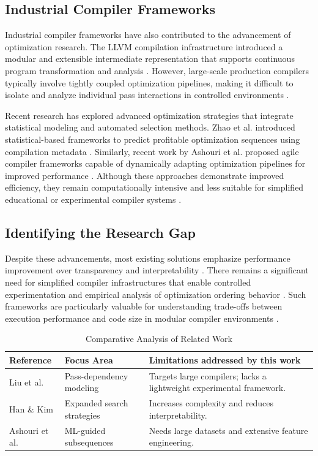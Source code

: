 \documentclass[conference]{IEEEtran}
\begin{document}
\subsection{Industrial Compiler Frameworks}
Industrial compiler frameworks have also contributed to the advancement of optimization research. The LLVM compilation infrastructure introduced a modular and extensible intermediate representation that supports continuous program transformation and analysis \cite{ref16}. However, large-scale production compilers typically involve tightly coupled optimization pipelines, making it difficult to isolate and analyze individual pass interactions in controlled environments \cite{ref16}.

Recent research has explored advanced optimization strategies that integrate statistical modeling and automated selection methods. Zhao et al. introduced statistical-based frameworks to predict profitable optimization sequences using compilation metadata \cite{ref7}. Similarly, recent work by Ashouri et al. proposed agile compiler frameworks capable of dynamically adapting optimization pipelines for improved performance \cite{ref27}. Although these approaches demonstrate improved efficiency, they remain computationally intensive and less suitable for simplified educational or experimental compiler systems \cite{ref27}.

\subsection{Identifying the Research Gap}
Despite these advancements, most existing solutions emphasize performance improvement over transparency and interpretability \cite{ref2}. There remains a significant need for simplified compiler infrastructures that enable controlled experimentation and empirical analysis of optimization ordering behavior \cite{ref1}. Such frameworks are particularly valuable for understanding trade-offs between execution performance and code size in modular compiler environments \cite{ref19}.

\begin{table}[htbp]
\caption{Comparative Analysis of Related Work}
\label{tab:lit_review}
\centering
\renewcommand{\arraystretch}{1.3}
\begin{tabularx}{\columnwidth}{@{}p{} p{} X@{}}
\toprule
\textbf{Reference} & \textbf{Focus Area} & \textbf{Limitations addressed by this work} \\
\midrule
Liu et al. \cite{ref1} & Pass-dependency modeling & Targets large compilers; lacks a lightweight experimental framework. \\
\addlinespace
Han \& Kim \cite{ref2} & Expanded search strategies & Increases complexity and reduces interpretability. \\
\addlinespace
Ashouri et al. \cite{ref15} & ML-guided subsequences & Needs large datasets and extensive feature engineering. \\
\bottomrule
\end{tabularx}
\end{table}
\end{document}
